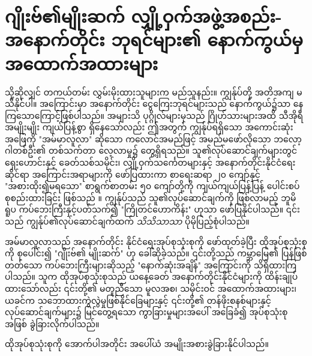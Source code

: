 \documentclass[10pt,twocolumn,letterpaper]{article}
\begin{document}
\section{ဂျိုးဗ်၏မျိုးဆက် လျှို့ဝှက်အဖွဲ့အစည်း- အနောက်တိုင်း ဘုရင်များ၏ နောက်ကွယ်မှ အထောက်အထားများ}

သို့ဆိုလျှင် တကယ်တမ်း လွှမ်းမိုးထားသူများက မည်သူနည်း။ ကျွန်ုပ်တို့ အတိအကျ မသိနိုင်ပါ။ အကြောင်းမှာ အနောက်တိုင်း ငွေကြေးဘုရင်များသည် နောက်ကွယ်၌သာ နေကြသောကြောင့်ဖြစ်ပါသည်။ အများသိ ပုဂ္ဂိုလ်များမှသည် ဂြိုဟ်သားများအထိ သီအိုရီအမျိုးမျိုး ကျယ်ပြန့်စွာ ရှိနေသော်လည်း ဤအတွက် ကျွန်ုပ်ရရှိသော အကောင်းဆုံးအဖြေကို "အမ်မာလူလာ" ဆိုသော ကလောင်အမည်ဖြင့် အမည်မဖော်လိုသော ဘလော့ဂါတစ်ဦး၏ တစ်သက်တာ လေ့လာမှု၌ တွေ့ရှိရသည်။ သူ၏လုပ်ဆောင်ချက်များတွင် ရှေးဟောင်းနှင့် ခေတ်သစ်သမိုင်း၊ လျှို့ဝှက်သင်္ကေတများနှင့် အနောက်တိုင်းနိုင်ငံရေးဆိုင်ရာ အကြောင်းအရာများကို ဖော်ပြထားကာ စာရေးဆရာ ၂၀ ကျော်နှင့် "အစားထိုး၍မရသော" စာရွက်စာတမ်း ၅၀ ကျော်တို့ကို ကျယ်ကျယ်ပြန့်ပြန့် ပေါင်းစပ်စုစည်းထားခြင်း ဖြစ်သည် \cite{33,34}။ ကျွန်ုပ်သည် သူ၏လုပ်ဆောင်ချက်ကို ဖြစ်လာမည့် ဘူမိရူပ ကပ်ဘေးကြီးနှင့်ပတ်သက်၍ "ကြိုတင်ဟောကိန်း" ဟုသာ ဖော်ပြနိုင်ပါသည်။ ၎င်းသည် ကျွန်ုပ်၏လုပ်ဆောင်ချက်ထက် \textit{သိသိသာသာ} ပိုမိုပြည့်စုံပါသည်။

အမ်မာလူလာသည် အနောက်တိုင်း နိုင်ငံရေးအုပ်စုသုံးစုကို ဖော်ထုတ်ခဲ့ပြီး ထိုအုပ်စုသုံးစုကို စုပေါင်း၍ "ဂျိုးဗ်၏ မျိုးဆက်" ဟု ခေါ်ဆိုခဲ့သည်။ ၎င်းတို့သည် ကမ္ဘာမြေ၏ ပြန်ဖြစ်တတ်သော ကပ်ဘေးကြီးများဆိုသည့် "နောက်ဆုံးအချိန်" အကြောင်းကို သိရှိထားကြပါသည်။ သူက ထိုအုပ်စုသုံးစုသည် ယနေ့ခေတ် အနောက်တိုင်းနိုင်ငံများကို ထိန်းချုပ်ထားသော်လည်း ၎င်းတို့၏ မတူညီသော မူလအစ၊ သမိုင်းဝင် အထောက်အထားများ၊ ယခင်က သဘောထားကွဲလွဲမှုဖြစ်နိုင်ခြေများနှင့် ၎င်းတို့၏ တန်ဖိုးစနစ်များနှင့် လုပ်ဆောင်ချက်များ၌ မြင်တွေ့ရသော ကွာခြားမှုများအပေါ် အခြေခံ၍ အုပ်စုသုံးစုအဖြစ် ခွဲခြားလိုက်ပါသည်။

ထိုအုပ်စုသုံးစုကို အောက်ပါအတိုင်း အပေါ်ယံ အမျိုးအစားခွဲခြားနိုင်ပါသည်။
\end{document}
